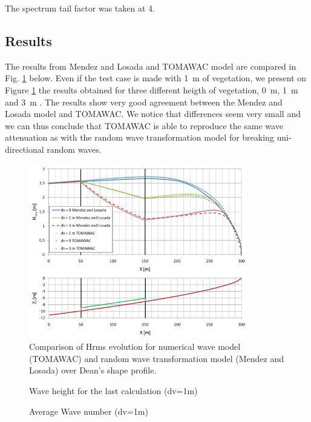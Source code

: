 The spectrum tail factor was taken at 4.

\subsection{Results}
%
 The results from Mendez and Losada and TOMAWAC model are compared in Fig. \ref{figresvito} below.
Even if the test case is made with 1~m of vegetation, we present on Figure \ref{figresvito} the results obtained for three different heigth of vegetation, 0~m, 1~m and 3~m \cite{Bacchi2014}.
The results show very good agreement between the Mendez  and Losada model \cite{Mendez2004} and TOMAWAC. We notice that differences seem very small and we can thus conclude that TOMAWAC is able to reproduce the same wave attenuation as with the random wave transformation model for breaking uni-directional random waves.
\begin{figure} [!h]
\centering
\includegraphics[width=0.85\textwidth]{resdean.png}
 \caption{Comparison of Hrms evolution for numerical wave model (TOMAWAC) and random wave transformation model (Mendez and Losada) over Dean’s shape profile.}
\label{figresvito}
\end{figure}

\begin{figure} [!h]
\centering
{}
 \caption{Wave height for the last calculation (dv=1m)}
\label{figrescalc}
\end{figure}

\begin{figure} [!h]
\centering
{}
 \caption{Average Wave number (dv=1m)}
\label{figkmoy}
\end{figure}


